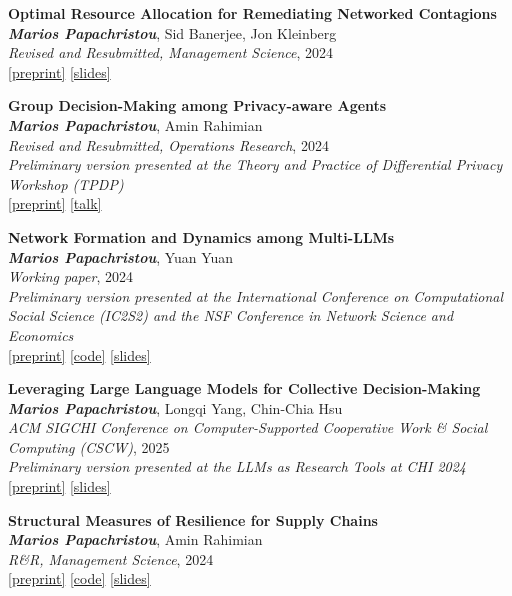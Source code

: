 \documentclass[margin]{res}
\newcommand{\specialurl}[2]{\href {#2} {{{[#1]}}}}
\newcommand{\preprint}[1]{\specialurl {preprint} {#1}}
\newcommand{\code}[1]{\specialurl {code} {#1}}
\newcommand{\talk}[1]{\specialurl {talk} {#1}}
\newcommand{\slides}[1]{\specialurl {slides} {#1}}
\newcommand{\authorref}[1]{{\textit{\textbf{#1}}}}
\newcommand{\authorme}{\authorref{Marios Papachristou}}
\newcommand{\publication}[5]{\textbf{#1}\\{#2}\\\emph{#3}, {#4}\\{#5}\smallskip}
\begin{document}
\begin{resume}
{\begin{enumerate}[nosep, label={[WP\arabic*]}]
   \item \publication{Optimal Resource Allocation for Remediating Networked Contagions}{\authorme, Sid Banerjee, Jon Kleinberg}{Revised and Resubmitted, Management Science}{2024}{\preprint{https://papers.ssrn.com/sol3/papers.cfm?abstract_id=4880536} \slides{https://drive.google.com/file/d/1DgOCnJ5Pf3Je-F7a-Adiy2TTZ7oZUbbB/view?usp=sharing}} 
      \item \publication{Group Decision-Making among Privacy-aware Agents}{\authorme, Amin Rahimian}{Revised and Resubmitted, Operations Research}{2024}{
  		\emph{Preliminary version presented at the Theory and Practice of Differential Privacy Workshop (TPDP)} \\ \preprint{https://arxiv.org/pdf/2402.08156.pdf} \talk{https://www.youtube.com/watch?v=Kmm5HEMuS4w}}
  		
   \item \publication{Network Formation and Dynamics among Multi-LLMs}{\authorme, Yuan Yuan}{Working paper}{2024}{\emph{Preliminary version presented at the International Conference on Computational Social Science (IC2S2) and the NSF Conference in Network Science and Economics} \\ \preprint{http://arxiv.org/abs/2402.10659} \code{https://github.com/papachristoumarios/llm-network-formation} \slides{https://drive.google.com/file/d/13Qm_82D0WrkmN1LAv2AUmjcputMOdm_y/view?usp=drive_link}} 
      
   \item \publication{Leveraging Large Language Models for Collective Decision-Making}{\authorme, Longqi Yang, Chin-Chia Hsu}{ACM SIGCHI Conference on Computer-Supported Cooperative Work \& Social Computing (CSCW)}{2025}{\emph{Preliminary version presented at the LLMs as Research Tools at CHI 2024} \\ \preprint{https://arxiv.org/abs/2311.04928} \slides{https://docs.google.com/presentation/d/13IsUt68rFoKdtq8wquL9fxVFHwH0hgvN/edit?usp=drive_link&ouid=109899272296285628946&rtpof=true&sd=true}}


   	   
   \item \publication{Structural Measures of Resilience for Supply Chains}{\authorme, Amin Rahimian}{R\&R, Management Science}{2024}{ 
   		\preprint{https://papers.ssrn.com/sol3/papers.cfm?abstract_id=4392226} \code{https://github.com/papachristoumarios/supply-chain-resilience} \slides{https://drive.google.com/file/d/13kgKnjTHyO8j4BOJVykWwt43hSt3JrLw/view?usp=drive_link}}
   		

\end{enumerate}}
\end{resume}
\end{document}
